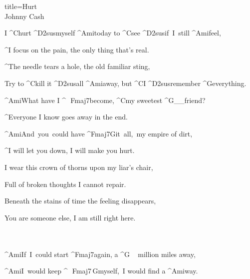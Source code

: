 \begin{song}{title=\predtitle\centering Hurt \\\large Johnny Cash \vspace*{-0.3cm}}  %
\begin{centerjustified}
\nejvetsi

\sloka
	I ^{C}hurt ^{D2sus}myself ^{Ami}today to ^{C}see ^{\:D2sus}if~I~still ^{Ami}feel,

	^{\phantom{.}}I focus on the pain, the only thing that's real.

	^{\phantom{.}}The needle tears a hole, the old familiar sting,

	Try to ^{C}kill it ^{D2sus}all ^{Ami}away, but ^{C}I ^{\:\:D2sus}remember ^{G}everything.


	^{Ami}What have I ^{\,\,\,\,Fmaj7}become, ^{C}my sweetest ^{G{\color{white}\_\_}}friend?

	^{\phantom{.}}Everyone I know goes away in the end.

	^{Ami\:\:\:}And~you~could have ^{\z Fmaj7G\:}it~all,~my empire of dirt,

	^{\phantom{.}}I will let you down, I will make you hurt.

\sloka
	 I wear this crown of thorns upon my liar's chair,

	Full of broken thoughts I cannot repair.

	Beneath the stains of time the feeling disappears,

	You are someone else, I am still right here.


\\\\

	^{Ami\z}If~I~could start ^{Fmaj7}again, a ^{G\,\,\,\,\,\,\,}million miles away,

	^{Ami\z}I~would keep ^{\,\,\,\,Fmaj7\z \,G}myself,~I would find a ^{Ami}way.

\end{centerjustified}
\setcounter{Slokočet}{0}
\end{song}
